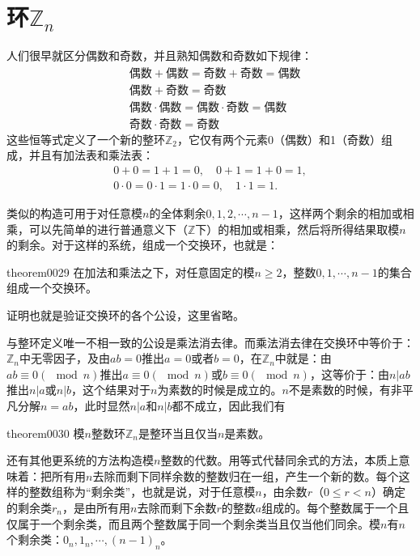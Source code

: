 \section{环$\mathbb{Z}_n$}\label{subsection0010110}
人们很早就区分偶数和奇数，并且熟知偶数和奇数如下规律：
\[
\begin{aligned}
&\text{偶数}+\text{偶数} = \text{奇数} + \text{奇数} = \text{偶数}\\
&\text{偶数}+\text{奇数} = \text{奇数}\\
&\text{偶数}\cdot\text{偶数} = \text{偶数}\cdot\text{奇数} = \text{偶数}\\
&\text{奇数} \cdot \text{奇数} = \text{奇数}
\end{aligned}
\]
这些恒等式定义了一个新的整环$\mathbb{Z}_2$，它仅有两个元素0（偶数）和1（奇数）组成，并且有加法表和乘法表：
\begin{gather*}
0+0=1+1=0, \quad 0+1=1+0=1,\\
0 \cdot 0=0 \cdot 1= 1 \cdot 0 =0,\quad 1 \cdot 1 = 1.
\end{gather*}

类似的构造可用于对任意模$n$的全体剩余$0,1,2,\cdots,n-1$，这样两个剩余的相加或相乘，可以先简单的进行普通意义下（$\mathbb{Z}$下）的相加或相乘，然后将所得结果取模$n$的剩余。对于这样的系统，组成一个交换环，也就是：
\begin{theorem}{}{theorem0029}
在加法和乘法之下，对任意固定的模$n \ge 2$，整数$0, 1, \cdots, n-1$的集合组成一个交换环。
\end{theorem}

证明也就是验证交换环的各个公设，这里省略。

与整环定义唯一不相一致的公设是乘法消去律。而乘法消去律在交换环中等价于：$\mathbb{Z}_n$中无零因子，及由$ab=0$推出$a=0$或者$b=0$，在$\mathbb{Z}_n$中就是：由$ab \equiv 0(\mod{n})$推出$a \equiv 0(\mod{n})$或$b \equiv 0(\mod{n})$，这等价于：由$n|ab$推出$n|a$或$n|b$，这个结果对于$n$为素数的时候是成立的。$n$不是素数的时候，有非平凡分解$n=ab$，此时显然$n|a$和$n|b$都不成立，因此我们有
\begin{theorem}{}{theorem0030}
模$n$整数环$\mathbb{Z}_n$是整环当且仅当$n$是素数。
\end{theorem}

还有其他更系统的方法构造模$n$整数的代数。用等式代替同余式的方法，本质上意味着：把所有用$n$去除而剩下同样余数的整数归在一组，产生一个新的数。每个这样的整数组称为“剩余类”，也就是说，对于任意模$n$，由余数$r$（$0 \le r < n$）确定的剩余类$r_n$，是由所有用$n$去除而剩下余数$r$的整数$a$组成的。每个整数属于一个且仅属于一个剩余类，而且两个整数属于同一个剩余类当且仅当他们同余。模$n$有$n$个剩余类：$0_n,1_n,\cdots,(n-1)_n$。

